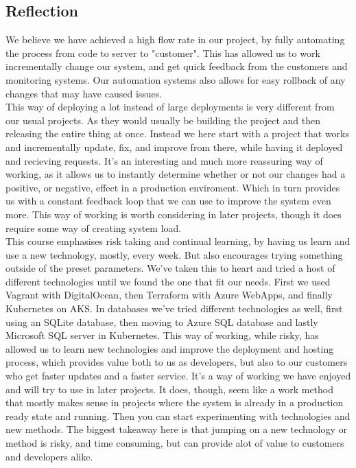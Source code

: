 \subsection{Reflection}
We believe we have achieved a high flow rate in our project, by fully automating the process from code to server to "customer".
This has allowed us to work incrementally change our system, and get quick feedback from the customers and monitoring systems.
Our automation systems also allows for easy rollback of any changes that may have caused issues.\\

This way of deploying a lot instead of large deployments is very different from our usual projects. As they would usually be building the project and then releasing the entire thing at once.
Instead we here start with a project that works and incrementally update, fix, and improve from there, while having it deployed and recieving requests.
It's an interesting and much more reassuring way of working, as it allows us to instantly determine whether or not our changes had a positive, or negative, effect in a production enviroment.
Which in turn provides us with a constant feedback loop that we can use to improve the system even more.
This way of working is worth considering in later projects, though it does require some way of creating system load.\\

This course emphasises risk taking and continual learning, by having us learn and use a new technology, mostly, every week.
But also encourages trying something outside of the preset parameters.
We've taken this to heart and tried a host of different technologies until we found the one that fit our needs. First we used Vagrant with DigitalOcean, then Terraform with Azure WebApps, and finally Kubernetes on AKS.
In databases we've tried different technologies as well, first using an SQLite database, then moving to Azure SQL database and lastly Microsoft SQL server in Kubernetes.
This way of working, while risky, has allowed us to learn new technologies and improve the deployment and hosting process, which provides value both to us as developers, but also to our customers who get faster updates and a faster service.
It's a way of working we have enjoyed and will try to use in later projects. It does, though, seem like a work method that mostly makes sense in projects where the system is already in a production ready state and running. Then you can start experimenting with technologies and new methods.
The biggest takeaway here is that jumping on a new technology or method is risky, and time consuming, but can provide alot of value to customers and developers alike.

